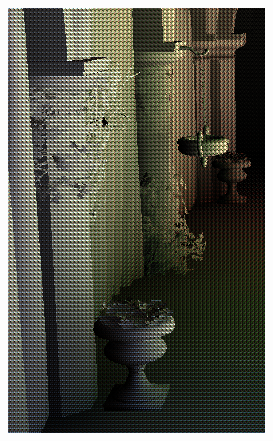 \begin{figure}[htb]
    \centering
    \begin{subfigure}[b]{0.20\textwidth}
        \centering
        \includegraphics[width=.95\textwidth]{screenshots/interleaved_before}
        \caption{}
        \label{fig:results:interleaved_before}%
    \end{subfigure}%
    \begin{subfigure}[b]{0.20\textwidth}
        \centering

\end{subfigure}
\end{figure}
